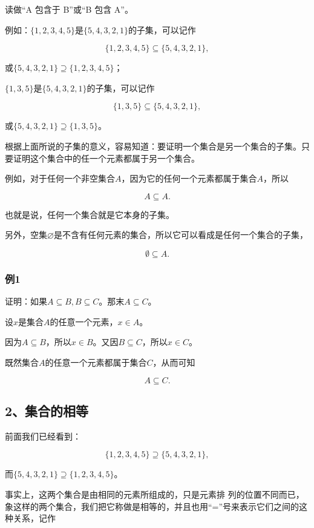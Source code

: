 读做``A 包含于 B''或``B 包含 A''。

例如：\(\{1,2,3,4,5\}\)是\(\{5,4,3,2,1\}\)的子集，可以记作

\[
\{1, 2, 3, 4, 5 \} \subseteq \{5, 4, 3, 2, 1 \},
\]

或\(\{5,4,3,2,1\} \supseteq \{1,2,3,4,5\}\)；

\(\{1,3,5\}\)是\(\{5,4,3,2,1\}\)的子集，可以记作

\[
\{1, 3, 5 \} \subseteq \{5, 4, 3, 2, 1 \},
\]

或\(\{5,4,3,2,1\} \supseteq \{1,3,5\}\)。

根据上面所说的子集的意义，容易知道：要证明一个集合是另一个集合的子集。只要证明这个集合中的任一个元素都属于另一个集合。

例如，对于任何一个非空集合\(A\)，因为它的任何一个元素都属于集合\(A\)，所以

\[
A \subseteq A.
\]

也就是说，任何一个集合就是它本身的子集。

另外，空集\(\varnothing\)是不含有任何元素的集合，所以它可以看成是任何一个集合的子集，

\[
\emptyset \subseteq A.
\]

\subsubsection{例1}

证明：如果\(A \subseteq B, B \subseteq C\)。那末\(A \subseteq C\)。

 设\(x\)是集合\(A\)的任意一个元素，\(x \in A\)。

因为\(A \subseteq B\)，所以\(x \in B\)。又因\(B \subseteq C\)，所以\(x \in C\)。

既然集合\(A\)的任意一个元素都属于集合\(C\)，从而可知

\[
A \subseteq C.
\]

\subsection{2、集合的相等}

前面我们已经看到：

\[
\{1, 2, 3, 4, 5 \} \supseteq \{5, 4, 3, 2, 1 \},
\]

而\(\{5, 4, 3, 2, 1\} \supseteq \{1, 2, 3, 4, 5\}\)。

事实上，这两个集合是由相同的元素所组成的，只是元素排
列的位置不同而已，象这样的两个集合，我们把它称做是相等的，并且也用``=''号来表示它们之间的这种关系，记作

